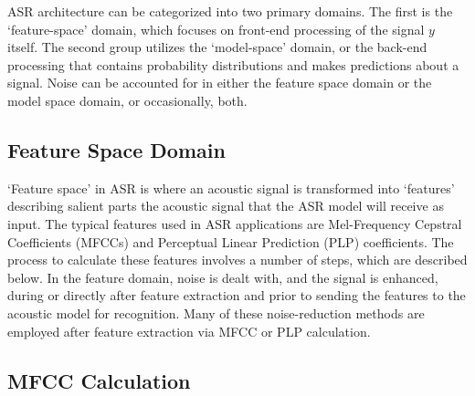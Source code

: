 ASR architecture can be categorized into two primary domains. The first is the `feature-space' domain, which focuses on front-end processing of the signal $y$ itself.  The second group utilizes the `model-space' domain, or the back-end processing that contains probability distributions and makes predictions about a signal. %
Noise can be accounted for in either the feature space domain or the model space domain, or occasionally, both.  %

\subsection{Feature Space Domain}

`Feature space' in ASR is where an acoustic signal is transformed into `features' describing salient parts the acoustic signal that the ASR model will receive as input. The typical features used in ASR applications are Mel-Frequency Cepstral Coefficients (MFCCs) and Perceptual Linear Prediction (PLP) coefficients. The process to calculate these features involves a number of steps, which are described below.  In the feature domain, noise is dealt with, and the signal is enhanced, during or directly after feature extraction and prior to sending the features to the acoustic model for recognition.  Many of these noise-reduction methods are employed after feature extraction via MFCC or PLP calculation.

\subsection{MFCC Calculation}\label{sec:mfcc-calc}

